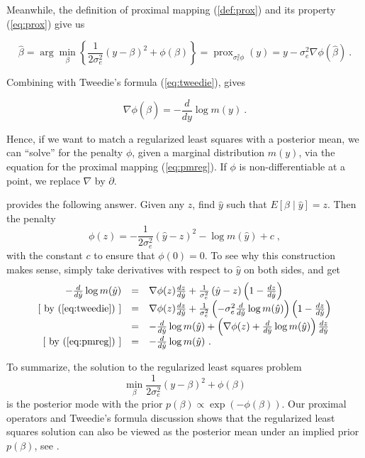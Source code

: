 \documentclass[11pt]{article}%
\newcommand{\prox}{ \mathop{\mathrm{prox}} }
\numberwithin{equation}{section}
\theoremstyle{plain}
\begin{document}
Meanwhile, the definition of proximal mapping (\ref{def:prox}) and its property (\ref{eq:prox}) give us

$$
\hat{\beta} = \arg\min_\beta \left\{\frac1{2\sigma_e^2}(y -\beta)^2 + \phi(\beta)\right\} = \prox_{\sigma_e^2\phi}\left(y\right) = y - \sigma_e^2\nabla \phi\left(\hat\beta\right) \ .
$$

Combining with Tweedie's formula (\ref{eq:tweedie}), gives

\begin{equation}
\label{eq:pmreg}
\nabla \phi\left(\hat\beta\right) = - \frac{d}{dy} \log m(y) \ .
\end{equation}

Hence, if we want to match a regularized least squares with a posterior mean, we can ``solve'' for the penalty $\phi$, given a marginal distribution $m(y)$, via the equation for the proximal mapping (\ref{eq:pmreg}).  If $ \phi $ is non-differentiable at a point, we replace $ \nabla $ by $ \partial $.

\cite{gribonval2011} provides the following answer.  Given any $z$, find $\hat y$ such that $E\left[ \beta \mid\hat y\right] = z$. Then the penalty
\begin{equation}
\label{eq:phi}
\phi(z) = -\frac1{2\sigma_e^2}(\hat y - z)^2 - \log m\left( \hat y\right) + c \; ,
\end{equation}
with the constant $c$ to ensure that $\phi(0) = 0$. To see why this construction makes sense, simply take derivatives with respect to $\hat y$ on both sides, and get
$$
\begin{array}{rcl}
- \frac{d}{d\hat y} \log m(\hat y) & = & \nabla\phi(z)\frac{dz}{d\hat y} + \frac1{\sigma_e^2}\left(\hat y - z\right)\left(1 - \frac{dz}{d\hat y}\right) \\
\left[\text{ by (\ref{eq:tweedie}) }\right] & = & \nabla\phi(z)\frac{dz}{d\hat y} + \frac1{\sigma_e^2}\left(-\sigma_e^2\frac{d}{d\hat y} \log m(\hat y)\right)\left(1 - \frac{dz}{d\hat y}\right) \\
& = & - \frac{d}{d\hat y} \log m(\hat y) + \left(\nabla\phi(z) + \frac{d}{d\hat y} \log m(\hat y)\right)\frac{dz}{d\hat y} \\
\left[\text{ by (\ref{eq:pmreg}) }\right]& = & - \frac{d}{d\hat y} \log m(\hat y) \ .
\end{array}
$$


To summarize, the solution to the regularized least squares problem
$$
\min_\beta\frac1{2\sigma_e^2}\left(y - \beta\right)^2 + \phi\left(\beta\right)
$$
is the posterior mode with the prior $p\left(\beta\right) \propto \exp\left(-\phi\left(\beta\right)\right)$.  Our proximal operators and Tweedie's formula discussion shows that the regularized least squares solution can also be viewed as the posterior mean under an implied prior $p\left(\beta\right)$, see \cite{strawderman2013}.
\end{document}
